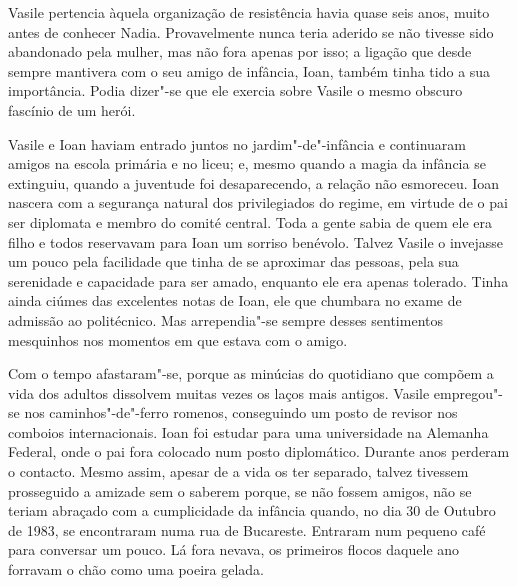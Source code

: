 \bigskip

Vasile pertencia àquela organização de resistência havia quase seis
anos, muito antes de conhecer Nadia. Provavelmente nunca teria aderido
se não tivesse sido abandonado pela mulher, mas não fora apenas por
isso; a ligação que desde sempre mantivera com o seu amigo de infância,
Ioan, também tinha tido a sua importância. Podia dizer"-se que ele
exercia sobre Vasile o mesmo obscuro fascínio de um herói.

Vasile e Ioan haviam entrado juntos no jardim"-de"-infância e continuaram amigos na escola primária e no liceu; e, mesmo
quando a magia da infância se extinguiu, quando a juventude foi
desaparecendo, a relação não esmoreceu. Ioan nascera com a segurança
natural dos privilegiados do regime, em virtude de o pai ser diplomata e
membro do comité central. Toda a gente sabia de quem ele era filho e
todos reservavam para Ioan um sorriso benévolo. Talvez Vasile o
invejasse um pouco pela facilidade que tinha de se aproximar das
pessoas, pela sua serenidade e capacidade para ser amado, enquanto ele
era apenas tolerado. Tinha ainda ciúmes das excelentes notas
de Ioan, ele que chumbara no exame de admissão ao politécnico. Mas
arrependia"-se sempre desses sentimentos mesquinhos nos momentos em que
estava com o amigo.

Com o tempo afastaram"-se, porque as minúcias do
quotidiano que compõem a vida dos adultos dissolvem muitas vezes os
laços mais antigos. Vasile empregou"-se nos caminhos"-de"-ferro romenos,
conseguindo um posto de revisor nos comboios internacionais. Ioan foi
estudar para uma universidade na Alemanha Federal, onde o pai fora
colocado num posto diplomático. Durante anos perderam o contacto. Mesmo
assim, apesar de a vida os ter separado, talvez tivessem prosseguido a
amizade sem o saberem porque, se não fossem amigos, não se teriam
abraçado com a cumplicidade da infância quando, no dia 30 de Outubro de
1983, se encontraram numa rua de Bucareste. Entraram num pequeno café
para conversar um pouco. Lá fora nevava, os primeiros flocos daquele ano
forravam o chão como uma poeira gelada.

